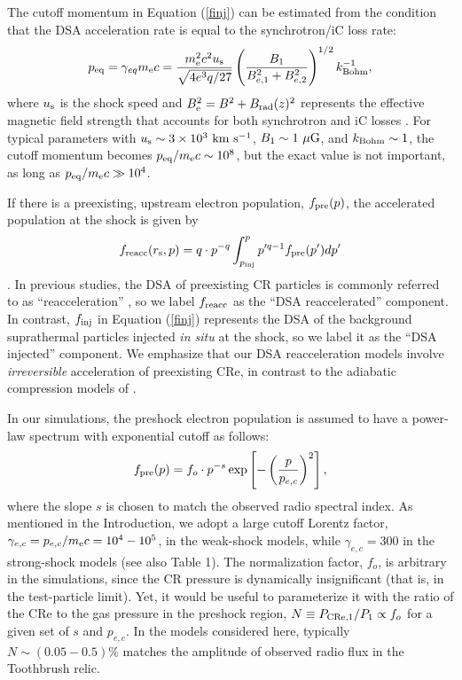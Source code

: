 \documentclass[twocolumn]{aastex61}
\def\kms{~{\rm km~s^{-1}}}
\def\muG{~{\mu\rm G}}
\begin{document}
The cutoff momentum in Equation (\ref{finj}) can be estimated from the condition that the DSA acceleration rate
is equal to the synchrotron/iC loss rate:
\begin{equation}
p_{\rm eq}= \gamma_{eq} m_{\rm e} c = {m_{\rm e}^2 c^2 u_{\rm s} \over \sqrt{4e^3q/27}}
\left({B_1 \over {B_{e,1}^2 + B_{e,2}^2}}\right)^{1/2} k_{\rm Bohm}^{-1},
\label{peq}
\end{equation}
where $u_{\rm s}$ is the shock speed and
$B_{\rm e}^2 = B^2 + B_{\rm rad}(z)^2$ represents the effective magnetic field strength that accounts for
both synchrotron and iC losses \citep{kang11}.
For typical parameters with $u_{\rm s}\sim 3\times 10^3 \kms$, $B_1\sim 1 \muG$, and $k_{\rm Bohm}\sim 1$, 
the cutoff momentum becomes $p_{\rm eq}/m_{\rm e} c\sim 10^8$, but the exact value is not important, 
as long as $p_{\rm eq}/m_{\rm e} c \gg10^4$.

If there is a preexisting, upstream electron population, $f_{\rm pre}(p)$, the accelerated population at the shock is given by
\begin{equation}
f_{\rm reacc}(r_{\rm s}, p)= q \cdot p^{-q} \int_{p_{\rm inj}}^p p^{\prime q-1} f_{\rm pre} (p^\prime) dp^\prime 
\label{freacc}
\end{equation}
\citep{dru83}.
In previous studies, the DSA of preexisting CR particles is commonly referred to as ``reacceleration''
\citep[e.g.,][]{kang12,pinzke13},
so we label $f_{\rm reacc}$ as the ``DSA reaccelerated'' component.
In contrast, $f_{\rm inj}$ in Equation (\ref{finj}) represents the DSA of the background suprathermal 
particles injected {\it in situ} at the shock, so we label it as the ``DSA injected'' component.
We emphasize that our DSA reacceleration models involve {\it irreversible} acceleration of preexisting CRe, 
in contrast to the adiabatic compression models of \citet{ensslin98}. 

In our simulations, the preshock electron population is assumed to have a power-law spectrum
with exponential cutoff as follows:
\begin{equation}
f_{\rm pre}(p) = f_o \cdot p^{-s} \exp \left[ - \left({p \over p_{e,c}} \right)^2 \right],
\label{fpre}
\end{equation}
where the slope $s$ is chosen to match the observed radio spectral index.
As mentioned in the Introduction, we adopt a large cutoff Lorentz factor, 
$\gamma_{e,c}= p_{e,c}/ m_{\rm e} c=10^4-10^5$, in the weak-shock models, 
while $\gamma_{e,c}=300$ in the strong-shock models (see also Table 1).
The normalization factor, $f_o$, is arbitrary in the simulations, 
since the CR pressure is dynamically insignificant (that is, in the test-particle limit).
Yet, it would be useful to parameterize it with the ratio of the CRe to the gas pressure in the preshock region, 
$N \equiv P_{\rm CRe,1}/P_1 \propto f_o$ for a given set of $s$ and $p_{e,c}$.
In the models considered here, typically $N \sim (0.05- 0.5) \%$ matches the amplitude of observed radio flux in the Toothbrush relic.
\end{document}
